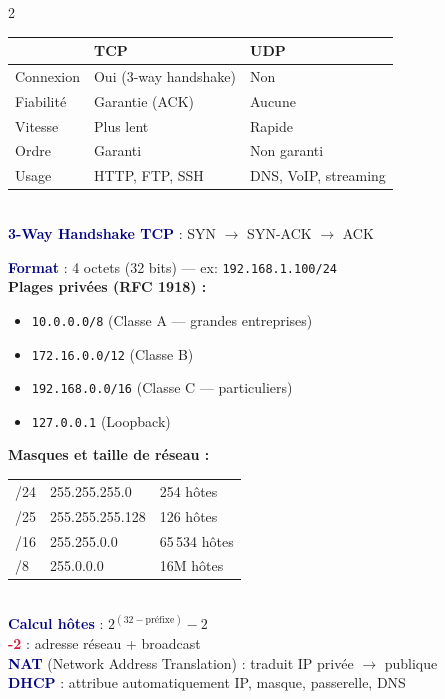 \documentclass[a4paper,10pt]{article}
\newcommand{\key}[1]{\textbf{\textcolor{navy}{#1}}}
\newcommand{\warn}[1]{\textbf{\textcolor{crimson}{#1}}}
\begin{document}
\begin{multicols}{2}
\begin{tcolorbox}[basebox, colframe=orange, title=3. TCP vs UDP]
\begin{tabularx}{\columnwidth}{lXX}
\toprule
 & \textbf{TCP} & \textbf{UDP} \\
\midrule
Connexion & Oui (3-way handshake) & Non \\
Fiabilité & Garantie (ACK) & Aucune \\
Vitesse & Plus lent & Rapide \\
Ordre & Garanti & Non garanti \\
Usage & HTTP, FTP, SSH & DNS, VoIP, streaming \\
\bottomrule
\end{tabularx}
\vspace{4pt}\\
\key{3-Way Handshake TCP} : SYN $\to$ SYN-ACK $\to$ ACK
\end{tcolorbox}

\begin{tcolorbox}[basebox, colframe=green, title=4. Adressage IPv4]
\key{Format} : 4 octets (32 bits) — ex: \texttt{192.168.1.100/24}\\[3pt]
\textbf{Plages privées (RFC 1918) :}
\begin{itemize}
  \item \texttt{10.0.0.0/8} \hfill (Classe A — grandes entreprises)
  \item \texttt{172.16.0.0/12} \hfill (Classe B)
  \item \texttt{192.168.0.0/16} \hfill (Classe C — particuliers)
  \item \texttt{127.0.0.1} \hfill (Loopback)
\end{itemize}

\textbf{Masques et taille de réseau :}\\
{\footnotesize
\begin{tabularx}{\columnwidth}{@{}llX@{}}
/24 & 255.255.255.0   & 254 hôtes \\
/25 & 255.255.255.128 & 126 hôtes \\
/16 & 255.255.0.0     & 65\,534 hôtes \\
/8  & 255.0.0.0       & 16M hôtes \\
\end{tabularx}}\\[3pt]
\key{Calcul hôtes} : $2^{(32 - \text{préfixe})} - 2$ \\
\warn{-2} : adresse réseau + broadcast \\[3pt]
\key{NAT} (Network Address Translation) : traduit IP privée $\to$ publique \\
\key{DHCP} : attribue automatiquement IP, masque, passerelle, DNS
\end{tcolorbox}


\end{multicols}
\end{document}
